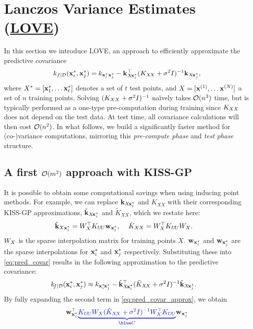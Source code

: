 \section{Lanczos Variance Estimates (\href{https://www.youtube.com/watch?v=t5ze_e4R9QY}{LOVE{}})}
\label{sec:method}

In this section we introduce LOVE{}, an approach to efficiently approximate the predictive covariance
\begin{align*}
  k_{f\mid\mathcal D}(\mathbf{x}^*_i, \mathbf{x}^*_j) = k_{\mathbf{x}^*_i \mathbf{x}^*_j} - \mathbf{k}_{X \! \mathbf{x}^*_i}^\top (K_{X\!X} + \sigma^2 I)^{-1} \mathbf{k}_{X \! \mathbf{x}^*_j},
\end{align*}
where $X^{*} = [ \mathbf{x}^*_1, \ldots \mathbf{x}^*_t ]$ denotes a set of $t$ test points, and $X = [\mathbf{x}^{(1)}, \ldots \mathbf{x}^{(N)}]$ a set of $n$ training points.
%
Solving $(K_{X X} + \sigma^2 I)^{-1}$ na\"ively takes $\bigo{n^3}$ time, but is typically performed as a one-type pre-computation during training since $K_{X X}$ does not depend on the test data.
At test time, all covariance calculations will then cost $\bigo{n^2}$.
In what follows, we build a significantly faster method for (co-)variance computations, mirroring this \emph{pre-compute phase} and \emph{test phase} structure.

\subsection{A first $\bigo{m^2}$ approach with KISS-GP}
It is possible to obtain some computational savings when using inducing point methods.
For example, we can replace $\mathbf{k}_{X \! \mathbf{x}^*_i}$ and $K_{X \! X}$ with their corresponding KISS-GP approximations,
$\tilde{\mathbf{k}}_{X \! \mathbf{x}^*_i}$ and $\tilde{K}_{X \! X}$, which we restate here:
%
%
\begin{align*}
  \tilde{\mathbf{k}}_{X \mathbf{x}^*_i} = W^\top_{X} K_{U \! U} \mathbf{w}_{\mathbf{x}^*_i},
  \: \: \: & \: \: \:
  \tilde{K}_{X X} = W^\top_{X} K_{U \! U} W_{X}.
\end{align*}
$W_{X}$ is the sparse interpolation matrix for training points $X$.
$\mathbf{w}_{\mathbf{x}^*_i}$ and $\mathbf{w}_{\mathbf{x}^*_j}$ are the sparse interpolations for $\mathbf{x}^*_i$ and $\mathbf{x}^*_j$ respectively.
Substituting these into \eqref{eq:pred_covar} results in the following approximation to the predictive covariance:
%
\begin{align}
  k_{\!f\mid\mathcal D}(\mathbf{x}^*_i, \mathbf{x}^*_j) &\approx k_{\mathbf{x}^*_i \! \mathbf{x}^*_j} - \tilde{\mathbf{k}}_{X \! \mathbf{x}^*_i}^\top (\tilde{K}_{X\!X} + \sigma^2 I)^{-1} \tilde{\mathbf{k}}_{X \! \mathbf{x}^*_j}.
    \label{eq:pred_covar_approx}
\end{align}
%
By fully expanding the second term in \eqref{eq:pred_covar_approx}, we obtain
%
\begin{equation}
  \bw_{\bxtest_i}^{\top} {\color{blue}\underbrace{{\bK_{U \! U} W_{\bX} (\tilde{K}_{\bX\!\bX} + \sigma^2 \bI)^{-1} W^\top_{\bX} \bK_{U \! U}}}_{\blue C}} \bw_{\bxtest_j}
  \label{eq:pred_covar_ski_cache}
\end{equation}
%


